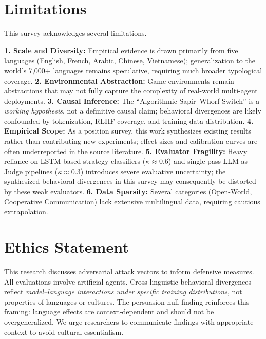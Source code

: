 \documentclass[11pt]{article}
\begin{document}
\section*{Limitations}

This survey acknowledges several limitations.

\noindent \textbf{1. Scale and Diversity:} Empirical evidence is drawn primarily from five languages (English, French, Arabic, Chinese, Vietnamese); generalization to the world's 7,000+ languages remains speculative, requiring much broader typological coverage. \textbf{2. Environmental Abstraction:} Game environments remain abstractions that may not fully capture the complexity of real-world multi-agent deployments. \textbf{3. Causal Inference:} The ``Algorithmic Sapir--Whorf Switch'' is a \textit{working hypothesis}, not a definitive causal claim; behavioral divergences are likely confounded by tokenization, RLHF coverage, and training data distribution. \textbf{4. Empirical Scope:} As a position survey, this work synthesizes existing results rather than contributing new experiments; effect sizes and calibration curves are often underreported in the source literature. \textbf{5. Evaluator Fragility:} Heavy reliance on LSTM-based strategy classifiers ($\kappa \approx 0.6$) and single-pass LLM-as-Judge pipelines ($\kappa \approx 0.3$) introduces severe evaluative uncertainty; the synthesized behavioral divergences in this survey may consequently be distorted by these weak evaluators. \textbf{6. Data Sparsity:} Several categories (Open-World, Cooperative Communication) lack extensive multilingual data, requiring cautious extrapolation.

\section*{Ethics Statement}

This research discusses adversarial attack vectors to inform defensive measures. All evaluations involve artificial agents. Cross-linguistic behavioral divergences reflect \textit{model--language interactions under specific training distributions}, not properties of languages or cultures. The persuasion null finding \citep{arango2024persuasion} reinforces this framing: language effects are context-dependent and should not be overgeneralized. We urge researchers to communicate findings with appropriate context to avoid cultural essentialism.



\appendix
\end{document}
